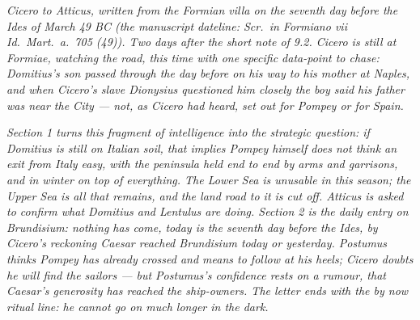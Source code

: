 
\textit{Cicero to Atticus, written from the Formian villa
on the seventh day before the Ides of March 49 BC (the
manuscript dateline: \textit{Scr.\ in Formiano vii Id.\
Mart.\ a.\ 705 (49)}). Two days after the short note of
9.2. Cicero is still at Formiae, watching the road, this
time with one specific data-point to chase: Domitius's
son passed through the day before on his way to his
mother at Naples, and when Cicero's slave Dionysius
questioned him closely the boy said his father was near
the City --- not, as Cicero had heard, set out for
Pompey or for Spain.}

\textit{Section 1 turns this fragment of intelligence
into the strategic question: if Domitius is still on
Italian soil, that implies Pompey himself does not
think an exit from Italy easy, with the peninsula held
end to end by arms and garrisons, and in winter on top
of everything. The Lower Sea is unusable in this season;
the Upper Sea is all that remains, and the land road to
it is cut off. Atticus is asked to confirm what Domitius
and Lentulus are doing. Section 2 is the daily entry on
Brundisium: nothing has come, today is the seventh day
before the Ides, by Cicero's reckoning Caesar reached
Brundisium today or yesterday. Postumus thinks Pompey
has already crossed and means to follow at his heels;
Cicero doubts he will find the sailors --- but
Postumus's confidence rests on a rumour, that Caesar's
generosity has reached the ship-owners. The letter ends
with the by now ritual line: he cannot go on much longer
in the dark.}

